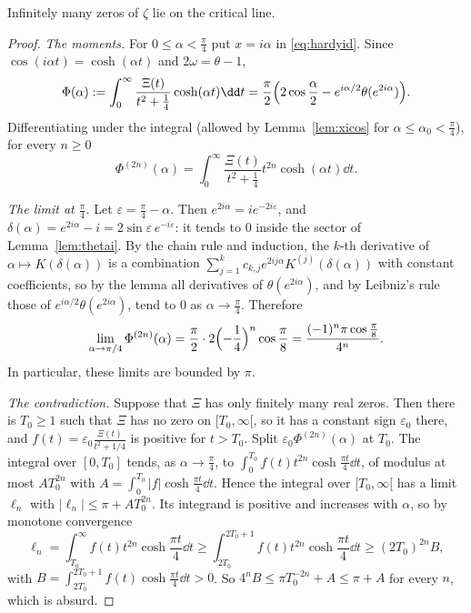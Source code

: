 \begin{theorem}[Hardy, 1914]\label{thm:hardy}
Infinitely many zeros of $\zeta$ lie on the critical line.
\end{theorem}
\begin{proof}
\emph{The moments.} For $0\le\alpha<\frac\pi4$ put $x=i\alpha$ in \eqref{eq:hardyid}. Since $\cos(i\alpha t)=\cosh(\alpha t)$ and $2\omega=\theta-1$,
\[
\Phi(\alpha):=\int_0^\infty\frac{\Xi(t)}{t^2+\frac14}\cosh(\alpha t)\dd t=\frac\pi2\Bigl(2\cos\frac\alpha2-e^{i\alpha/2}\theta(e^{2i\alpha})\Bigr).
\]
Differentiating under the integral (allowed by Lemma~\ref{lem:xicos} for $\alpha\le\alpha_0<\frac\pi4$), for every $n\ge0$
\[
\Phi^{(2n)}(\alpha)=\int_0^\infty\frac{\Xi(t)}{t^2+\frac14}t^{2n}\cosh(\alpha t)\dd t.
\]

\emph{The limit at $\frac\pi4$.} Let $\varepsilon=\frac\pi4-\alpha$. Then $e^{2i\alpha}=ie^{-2i\varepsilon}$, and $\delta(\alpha)=e^{2i\alpha}-i=2\sin\varepsilon\,e^{-i\varepsilon}$: it tends to $0$ inside the sector of Lemma~\ref{lem:thetai}. By the chain rule and induction, the $k$-th derivative of $\alpha\mapsto K(\delta(\alpha))$ is a combination $\sum_{j=1}^kc_{k,j}e^{2ij\alpha}K^{(j)}(\delta(\alpha))$ with constant coefficients, so by the lemma all derivatives of $\theta(e^{2i\alpha})$, and by Leibniz's rule those of $e^{i\alpha/2}\theta(e^{2i\alpha})$, tend to $0$ as $\alpha\to\frac\pi4$. Therefore
\[
\lim_{\alpha\to\pi/4}\Phi^{(2n)}(\alpha)=\frac\pi2\cdot2\Bigl(-\frac14\Bigr)^n\cos\frac\pi8=\frac{(-1)^n\pi\cos\frac\pi8}{4^n}.
\]
In particular, these limits are bounded by $\pi$.

\emph{The contradiction.} Suppose that $\Xi$ has only finitely many real zeros. Then there is $T_0\ge1$ such that $\Xi$ has no zero on $[T_0,\infty[$, so it has a constant sign $\varepsilon_0$ there, and $f(t)=\varepsilon_0\frac{\Xi(t)}{t^2+1/4}$ is positive for $t>T_0$. Split $\varepsilon_0\Phi^{(2n)}(\alpha)$ at $T_0$. The integral over $[0,T_0]$ tends, as $\alpha\to\frac\pi4$, to $\int_0^{T_0}f(t)t^{2n}\cosh\frac{\pi t}4\dd t$, of modulus at most $AT_0^{2n}$ with $A=\int_0^{T_0}|f|\cosh\frac{\pi t}4\dd t$. Hence the integral over $[T_0,\infty[$ has a limit $\ell_n$ with $|\ell_n|\le\pi+AT_0^{2n}$. Its integrand is positive and increases with $\alpha$, so by monotone convergence
\[
\ell_n=\int_{T_0}^\infty f(t)t^{2n}\cosh\frac{\pi t}4\dd t\ge\int_{2T_0}^{2T_0+1}f(t)t^{2n}\cosh\frac{\pi t}4\dd t\ge(2T_0)^{2n}B,
\]
with $B=\int_{2T_0}^{2T_0+1}f(t)\cosh\frac{\pi t}4\dd t>0$. So $4^nB\le\pi T_0^{-2n}+A\le\pi+A$ for every $n$, which is absurd.
\end{proof}

